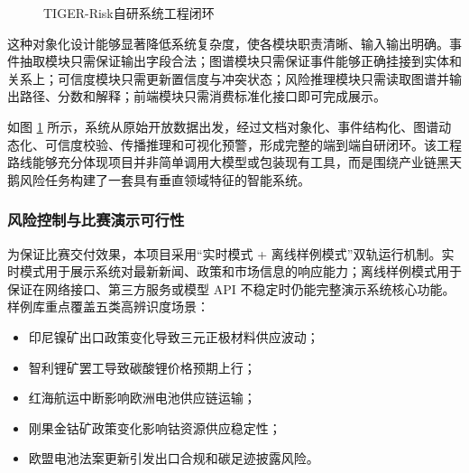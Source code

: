 ﻿\documentclass[12pt,a4paper]{article}
\newcommand{\projectshort}{TIGER-Risk}
\begin{document}
\begin{figure}[H]
{
}
\caption{\projectshort 自研系统工程闭环}
\label{fig:self-built-engineering-loop}
\end{figure}

这种对象化设计能够显著降低系统复杂度，使各模块职责清晰、输入输出明确。事件抽取模块只需保证输出字段合法；图谱模块只需保证事件能够正确挂接到实体和关系上；可信度模块只需更新置信度与冲突状态；风险推理模块只需读取图谱并输出路径、分数和解释；前端模块只需消费标准化接口即可完成展示。

如图 \ref{fig:self-built-engineering-loop} 所示，系统从原始开放数据出发，经过文档对象化、事件结构化、图谱动态化、可信度校验、传播推理和可视化预警，形成完整的端到端自研闭环。该工程路线能够充分体现项目并非简单调用大模型或包装现有工具，而是围绕产业链黑天鹅风险任务构建了一套具有垂直领域特征的智能系统。

\subsubsection{风险控制与比赛演示可行性}

为保证比赛交付效果，本项目采用“实时模式 + 离线样例模式”双轨运行机制。实时模式用于展示系统对最新新闻、政策和市场信息的响应能力；离线样例模式用于保证在网络接口、第三方服务或模型 API 不稳定时仍能完整演示系统核心功能。样例库重点覆盖五类高辨识度场景：
\begin{itemize}
    \item 印尼镍矿出口政策变化导致三元正极材料供应波动；
    \item 智利锂矿罢工导致碳酸锂价格预期上行；
    \item 红海航运中断影响欧洲电池供应链运输；
    \item 刚果金钴矿政策变化影响钴资源供应稳定性；
    \item 欧盟电池法案更新引发出口合规和碳足迹披露风险。
\end{itemize}
\end{document}
